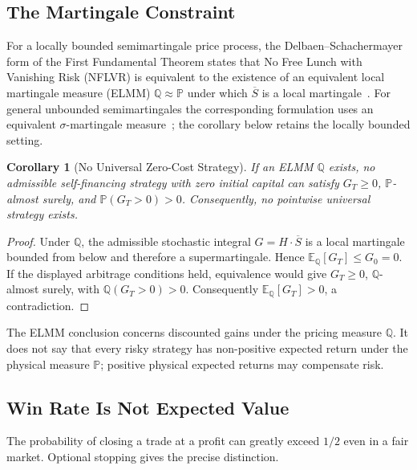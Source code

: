 \documentclass[aps,pra,reprint,superscriptaddress,amsmath,amssymb,floatfix]{revtex4-2}
\theoremstyle{plain}
\newtheorem{corollary}[theorem]{Corollary}
\theoremstyle{definition}
\theoremstyle{remark}
\begin{document}
\subsection{The Martingale Constraint}

For a locally bounded semimartingale price process, the
Delbaen--Schachermayer form of the First Fundamental Theorem states that No
Free Lunch with Vanishing Risk (NFLVR) is equivalent to the existence of an
equivalent local martingale measure (ELMM)
\(\mathbb{Q}\approx\mathbb{P}\) under which \(\overline S\) is a local
martingale~\cite{Harrison1981,Delbaen1994}. For general unbounded
semimartingales the corresponding formulation uses an equivalent
\(\sigma\)-martingale measure~\cite{DelbaenSchachermayer1998}; the corollary below
retains the locally bounded setting.

\begin{corollary}[No Universal Zero-Cost Strategy]
  \label{cor:noarb}
  If an ELMM \(\mathbb{Q}\) exists, no admissible self-financing strategy with
  zero initial capital can satisfy
  \(G_T\geq0\), \(\mathbb{P}\)-almost surely, and
  \(\mathbb{P}(G_T>0)>0\). Consequently, no pointwise universal strategy
  exists.
\end{corollary}

\begin{proof}
Under \(\mathbb{Q}\), the admissible stochastic integral
\(G=H\mathbin{\cdot}\overline S\) is a local martingale bounded from below and
therefore a supermartingale. Hence
\(\mathbb{E}_{\mathbb{Q}}[G_T]\leq G_0=0\). If the displayed arbitrage
conditions held, equivalence would give \(G_T\geq0\),
\(\mathbb{Q}\)-almost surely, with
\(\mathbb{Q}(G_T>0)>0\). Consequently
\(\mathbb{E}_{\mathbb{Q}}[G_T]>0\), a contradiction.
\end{proof}

The ELMM conclusion concerns discounted gains under the pricing measure
\(\mathbb{Q}\). It does not say that every risky strategy has non-positive
expected return under the physical measure \(\mathbb{P}\); positive physical
expected returns may compensate risk.

\subsection{Win Rate Is Not Expected Value}

The probability of closing a trade at a profit can greatly exceed \(1/2\)
even in a fair market. Optional stopping gives the precise distinction.
\end{document}
